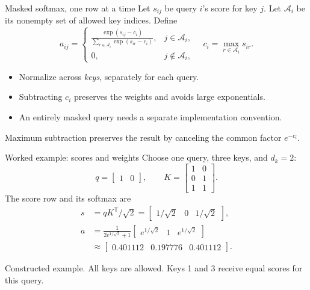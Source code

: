 \documentclass[aspectratio=169,11pt]{beamer}
\newcommand{\T}{\mathsf{T}}
\newcommand{\src}[1]{\par\vfill{\fontsize{7}{8.5}\selectfont\color{muted}#1}\par}
\begin{document}
\begin{frame}[t]{Masked softmax, one row at a time}
Let $s_{ij}$ be query $i$'s score for key $j$. Let $\mathcal A_i$ be its
\alert{nonempty} set of allowed key indices. Define
\[
  a_{ij}=\begin{cases}
    \displaystyle\frac{\exp(s_{ij}-c_i)}
      {\sum_{r\in\mathcal A_i}\exp(s_{ir}-c_i)},& j\in\mathcal A_i,\\[3mm]
    0,&j\notin\mathcal A_i,
  \end{cases}
  \quad c_i=\max_{r\in\mathcal A_i}s_{ir}.
\]
\begin{itemize}
  \item Normalize across \emph{keys}, separately for each query.
  \item Subtracting $c_i$ preserves the weights and avoids large exponentials.
  \item An entirely masked query needs a separate implementation convention.
\end{itemize}
\src{Maximum subtraction preserves the result by canceling the common factor $e^{-c_i}$.}
\end{frame}

\begin{frame}[t]{Worked example: scores and weights}
Choose one query, three keys, and $d_k=2$:
\[
  q=\begin{bmatrix}1&0\end{bmatrix},\qquad
  K=\begin{bmatrix}1&0\\0&1\\1&1\end{bmatrix}.
\]
The score row and its softmax are
\[
\begin{aligned}
  s&=qK^{\T}/\sqrt2
    =\begin{bmatrix}1/\sqrt2&0&1/\sqrt2\end{bmatrix},\\[1mm]
  a&=\frac{1}{2e^{1/\sqrt2}+1}
       \begin{bmatrix}e^{1/\sqrt2}&1&e^{1/\sqrt2}\end{bmatrix}\\
   &\approx\begin{bmatrix}0.401112&0.197776&0.401112\end{bmatrix}.
\end{aligned}
\]
\src{Constructed example. All keys are allowed. Keys 1 and 3 receive equal scores for this query.}
\end{frame}
\end{document}
